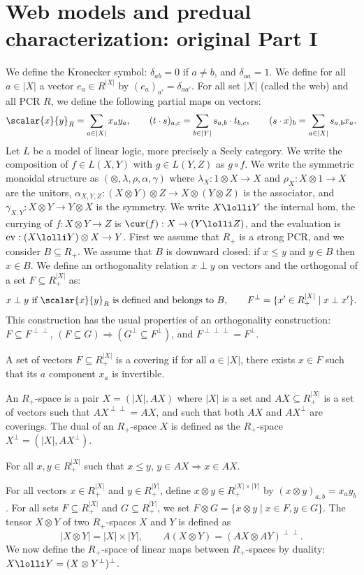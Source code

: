 \section*{Web models and predual characterization: original Part I}
We define the Kronecker symbol: $\delta_{ab}=0$ if $a\ne b$, and $\delta_{aa}=1$. We define for all $a\in |X|$ a vector $e_a\in R^{|X|}$ by $(e_a)_{a'}=\delta_{aa'}$. For all set $|X|$ (called the web) and all PCR $R$, we define the following partial maps on vectors:
\[\scalar{x}{y}_R=\sum_{a\in|X|}x_ay_a,\qquad (t\cdot s)_{a,c}=\sum_{b\in|Y|}s_{a,b}\cdot t_{b,c},\qquad(s\cdot x)_b=\sum_{a\in|X|}s_{a,b}x_a.\]
Let $L$ be a model of linear logic, more precisely a Seely category. We write the composition of $f\in L(X,Y)$ with $g\in L(Y,Z)$ as $g\circ f$. We write the symmetric monoidal structure as $(\otimes,\lambda,\rho,\alpha,\gamma)$ where $\lambda_X:1\otimes X\to X$ and $\rho_X:X\otimes1\to X$ are the unitors, $\alpha_{X,Y,Z}:(X\otimes Y)\otimes Z\to X\otimes(Y\otimes Z)$ is the associator, and $\gamma_{X,Y}:X\otimes Y\to Y\otimes X$ is the symmetry. We write $X\lolli Y$ the internal hom, the currying of $f:X\otimes Y\to Z$ is $\cur(f):X\to(Y\lolli Z)$, and the evaluation is $\mathrm{ev}:(X\lolli Y)\otimes X\to Y$.
First we assume that $R_+$ is a strong PCR, and we consider $B\subseteq R_+$. We assume that $B$ is downward closed: if $x\leq y$ and $y\in B$ then $x\in B$. We define an orthogonality relation $x\perp y$ on vectors and the orthogonal of a set $F\subseteq R_+^{|X|}$ as:
\[x\perp y\ \text{if }\scalar{x}{y}_R\text{ is defined and belongs to }B,\qquad F^\perp=\{x'\in R_+^{|X|}\mid x\perp x'\}.\]
This construction has the usual properties of an orthogonality construction: $F\subseteq F^{\perp\perp}$, $(F\subseteq G)\Rightarrow(G^\perp\subseteq F^\perp)$, and $F^{\perp\perp\perp}=F^\perp$.
\begin{originaldef}[14] A set of vectors $F\subseteq R_+^{|X|}$ is a covering if for all $a\in|X|$, there exists $x\in F$ such that its $a$ component $x_a$ is invertible.\end{originaldef}
\begin{originaldef}[15] An $R_+$-space is a pair $X=(|X|,AX)$ where $|X|$ is a set and $AX\subseteq R_+^{|X|}$ is a set of vectors such that $AX^{\perp\perp}=AX$, and such that both $AX$ and $AX^\perp$ are coverings. The dual of an $R_+$-space $X$ is defined as the $R_+$-space $X^\perp=(|X|,AX^\perp)$.\end{originaldef}
\begin{originallemma} For all $x,y\in R_+^{|X|}$ such that $x\leq y$, $y\in AX\Rightarrow x\in AX$.\end{originallemma}
For all vectors $x\in R_+^{|X|}$ and $y\in R_+^{|Y|}$, define $x\otimes y\in R_+^{|X|\times|Y|}$ by $(x\otimes y)_{a,b}=x_ay_b$. For all sets $F\subseteq R_+^{|X|}$ and $G\subseteq R_+^{|Y|}$, we set $F\otimes G=\{x\otimes y\mid x\in F,y\in G\}$. The tensor $X\otimes Y$ of two $R_+$-spaces $X$ and $Y$ is defined as
\[|X\otimes Y|=|X|\times|Y|,\qquad A(X\otimes Y)=(AX\otimes AY)^{\perp\perp}.\]
We now define the $R_+$-space of linear maps between $R_+$-spaces by duality: $X\lolli Y=(X\otimes Y^\perp)^\perp$.
